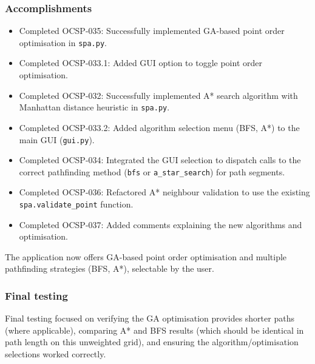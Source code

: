 \subsubsection{Accomplishments}
\begin{itemize}
	\item Completed OCSP-035: Successfully implemented GA-based point order optimisation in \verb|spa.py|.
	\item Completed OCSP-033.1: Added GUI option to toggle point order optimisation.
	\item Completed OCSP-032: Successfully implemented A* search algorithm with Manhattan distance heuristic in \verb|spa.py|.
	\item Completed OCSP-033.2: Added algorithm selection menu (BFS, A*) to the main GUI (\verb|gui.py|).
	\item Completed OCSP-034: Integrated the GUI selection to dispatch calls to the correct pathfinding method (\verb|bfs| or \verb|a_star_search|) for path segments.
	\item Completed OCSP-036: Refactored A* neighbour validation to use the existing \verb|spa.validate_point| function.
	\item Completed OCSP-037: Added comments explaining the new algorithms and optimisation.
\end{itemize}
The application now offers GA-based point order optimisation and multiple pathfinding strategies (BFS, A*), selectable by the user.

\subsubsection{Final testing}
Final testing focused on verifying the GA optimisation provides shorter paths (where applicable), comparing A* and BFS results (which should be identical in path length on this unweighted grid), and ensuring the algorithm/optimisation selections worked correctly.

